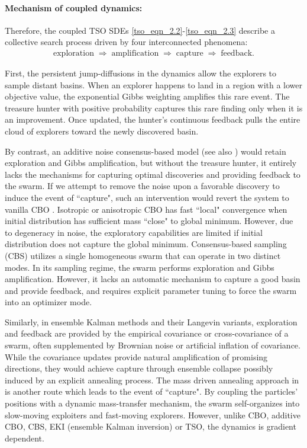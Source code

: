 \documentclass{article}
\numberwithin{equation}{section}
\begin{document}
\paragraph{Mechanism of coupled dynamics:} Therefore, the coupled TSO SDEs \eqref{tso_eqn_2.2}-\eqref{tso_eqn_2.3} describe a collective search process driven by four interconnected phenomena:
\begin{align}
\text{exploration}
\;\Longrightarrow\;
\text{amplification}
\;\Longrightarrow\;
\text{capture}
\;\Longrightarrow\;
\text{feedback}.
\end{align}

 First, the persistent jump-diffusions in the dynamics allow the explorers to sample distant basins. When an explorer happens to land in a region with a lower objective value, the exponential Gibbs weighting amplifies this rare event. The treasure hunter with positive probability captures this rare finding only when it is an improvement. Once updated, the hunter's continuous feedback  pulls the entire cloud of explorers toward the newly discovered basin.  


By contrast, an additive noise consensus-based model \cite{additive_CBO_2026}(see also \cite{choi2025modified}) would retain exploration and Gibbs amplification, but without the treasure hunter, it entirely lacks the mechanisms for capturing optimal discoveries and providing feedback to the swarm. If we attempt to remove the noise upon a favorable discovery to induce the event of  ``capture", such an intervention would revert the system to vanilla CBO \cite{pinnau2017consensus, carrillo2018analytical}. Isotropic or anisotropic CBO \cite{carrillo2018analytical, carrillo_shi_cbo} has fast ``local" convergence when initial distribution  has sufficient mass ``close" to global minimum. However, due to degeneracy in noise, the exploratory capabilities are limited if initial distribution does not capture the global  minimum.  Consensus-based sampling (CBS) \cite{carrillo2022consensus_sampling} utilizes a single homogeneous swarm that can operate in two distinct modes. In its sampling regime, the swarm performs exploration and Gibbs amplification. However, it lacks an automatic mechanism to capture a good basin and provide feedback, and requires explicit parameter tuning to force the swarm into an optimizer mode.

Similarly, in ensemble Kalman methods and their Langevin variants, exploration and feedback are provided by the empirical covariance or cross-covariance of a swarm, often supplemented by Brownian noise or artificial inflation of covariance. While the covariance updates provide natural amplification of promising directions, they would achieve capture through ensemble collapse possibly induced by an explicit annealing process. The mass driven annealing approach in \cite{ding2024swarm} is another route which leads to the event of ``capture". By coupling the particles' positions with a dynamic mass-transfer mechanism, the swarm self-organizes into slow-moving exploiters and fast-moving explorers. However, unlike CBO, additive CBO, CBS, EKI (ensemble Kalman inversion) or TSO, the dynamics is gradient dependent.   
\end{document}
